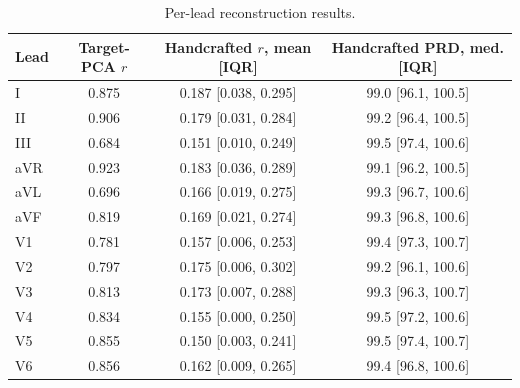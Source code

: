 \documentclass[journal]{IEEEtran}
\begin{document}
\begin{table}[ht]
\centering
\scriptsize
\setlength{\tabcolsep}{2.0pt}
\caption{Per-lead reconstruction results.}
\label{tab:reconstruction-leads}
\begin{tabular}{lccc}
\toprule
Lead & Target-PCA $r$ & Handcrafted $r$, mean [IQR] & Handcrafted PRD, med. [IQR] \\
\midrule
I   & 0.875 & 0.187 [0.038, 0.295] & 99.0 [96.1, 100.5] \\
II  & 0.906 & 0.179 [0.031, 0.284] & 99.2 [96.4, 100.5] \\
III & 0.684 & 0.151 [0.010, 0.249] & 99.5 [97.4, 100.6] \\
aVR & 0.923 & 0.183 [0.036, 0.289] & 99.1 [96.2, 100.5] \\
aVL & 0.696 & 0.166 [0.019, 0.275] & 99.3 [96.7, 100.6] \\
aVF & 0.819 & 0.169 [0.021, 0.274] & 99.3 [96.8, 100.6] \\
V1  & 0.781 & 0.157 [0.006, 0.253] & 99.4 [97.3, 100.7] \\
V2  & 0.797 & 0.175 [0.006, 0.302] & 99.2 [96.1, 100.6] \\
V3  & 0.813 & 0.173 [0.007, 0.288] & 99.3 [96.3, 100.7] \\
V4  & 0.834 & 0.155 [0.000, 0.250] & 99.5 [97.2, 100.6] \\
V5  & 0.855 & 0.150 [0.003, 0.241] & 99.5 [97.4, 100.7] \\
V6  & 0.856 & 0.162 [0.009, 0.265] & 99.4 [96.8, 100.6] \\
\bottomrule
\end{tabular}
\end{table}

\clearpage
\fi


\end{document}
